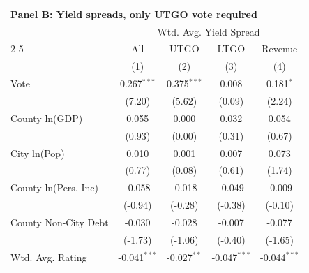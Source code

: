 \begingroup
\centering
\begin{tabular*}{\textwidth}{@{\extracolsep{\fill}}lcccc}
\multicolumn{5}{l}{\textbf{Panel B: Yield spreads, only UTGO vote required}}\\

\addlinespace
   \toprule
                               & \multicolumn{4}{c}{Wtd. Avg. Yield Spread}\\  
   \cmidrule(lr){2-5}
                               & All                    & UTGO                          & LTGO                          & Revenue \\   
                               & (1)                    & (2)                           & (3)                           & (4)\\  
   \midrule 
   Vote                        & 0.267$^{***}$          & 0.375$^{***}$                 & 0.008                         & 0.181$^{*}$\\   
                               & (7.20)                & (5.62)                       & (0.09)                       & (2.24)\\   
   County ln(GDP)              & 0.055                  & 0.000                         & 0.032                         & 0.054\\   
                               & (0.93)                & (0.00)                       & (0.31)                       & (0.67)\\   
   City ln(Pop)                & 0.010                  & 0.001                         & 0.007                         & 0.073\\   
                               & (0.77)                & (0.08)                       & (0.61)                       & (1.74)\\   
   County ln(Pers. Inc)        & -0.058                 & -0.018                        & -0.049                        & -0.009\\   
                               & (-0.94)               & (-0.28)                      & (-0.38)                      & (-0.10)\\   
   County Non-City Debt        & -0.030                 & -0.028                        & -0.007                        & -0.077\\   
                               & (-1.73)               & (-1.06)                      & (-0.40)                      & (-1.65)\\   
   Wtd. Avg. Rating            & -0.041$^{***}$         & -0.027$^{**}$                 & -0.047$^{***}$                & -0.044$^{***}$\\   

\end{tabular*}
